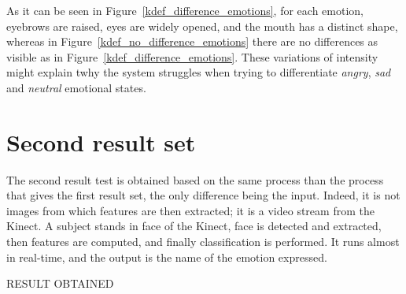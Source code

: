 \noindent As it can be seen in Figure~\ref{kdef_difference_emotions}, for each emotion, eyebrows are raised, eyes are widely opened, and the mouth has a distinct shape, whereas in Figure~\ref{kdef_no_difference_emotions} there are no differences as visible as in Figure~\ref{kdef_difference_emotions}. These variations of intensity might explain twhy the system struggles when trying to differentiate \textit{angry}, \textit{sad} and \textit{neutral} emotional states.
\newline

\section{Second result set}

\vspace{\baselineskip}
\noindent The second result test is obtained based on the same process than the process that gives the first result set, the only difference being the input. Indeed, it is not images from which features are then extracted; it is a video stream from the Kinect. A subject stands in face of the Kinect, face is detected and extracted, then features are computed, and finally classification is performed. It runs almost in real-time, and the output is the name of the emotion expressed.
\newline

\noindent RESULT OBTAINED
\newline

